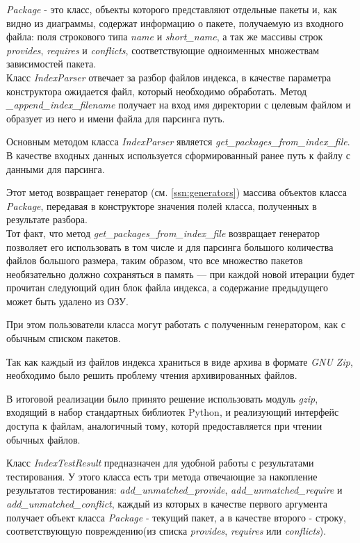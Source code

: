 \textit{Package} - это класс, объекты которого представляют отдельные пакеты и, как видно из диаграммы,
содержат информацию о пакете, получаемую из входного файла: поля строкового типа \textit{name} и 
\textit{short\_name}, а так же массивы строк \textit{provides}, \textit{requires}
и \textit{conflicts}, соответствующие одноименных множествам зависимостей пакета.
\\

Класс \textit{IndexParser} отвечает за разбор файлов индекса, в качестве параметра конструктора
ожидается файл, который необходимо обработать. Метод \textit{\_append\_index\_filename} получает на вход
имя директории с целевым файлом и образует из него и имени файла для парсинга
путь.

Основным методом класса \textit{IndexParser} является \textit{get\_packages\_from\_index\_file}.
В качестве входных данных используется сформированный ранее путь к файлу с данными
для парсинга. 

Этот метод возвращает генератор (см. \ref{ssn:generators}) массива объектов класса \textit{Package},
передавая в конструкторе значения полей класса, полученных в результате разбора.\\

Тот факт, что метод \textit{get\_packages\_from\_index\_file} возвращает генератор позволяет
его использовать в том числе и для парсинга большого количества файлов большого размера, 
таким образом, что все множество пакетов необязательно должно сохраняться в память ---
при каждой новой итерации будет прочитан следующий один блок файла индекса, 
а содержание предыдущего может быть удалено из ОЗУ.

При этом пользователи класса могут работать с полученным генератором, как с обычным списком пакетов.

Так как каждый из файлов индекса храниться в виде архива в формате \textit{GNU Zip}, 
необходимо было решить проблему чтения архивированных файлов.

В итоговой реализации было принято решение использовать модуль \textit{gzip}, 
входящий в набор стандартных библиотек Python, и реализующий интерфейс доступа к файлам,
аналогичный тому, которй предоставляется при чтении обычных файлов.

Класс \textit{IndexTestResult} предназначен для удобной работы с результатами тестирования. 
У этого класса есть три метода отвечающие за накопление результатов тестирования:
\textit{add\_unmatched\_provide}, \textit{add\_unmatched\_require} и \textit{add\_unmatched\_conflict}, каждый из которых
в качестве первого аргумента получает объект класса \textit{Package} - текущий пакет, а в качестве второго
- строку, соответствующую повреждению(из списка \textit{provides}, \textit{requires} или \textit{conflicts}).

